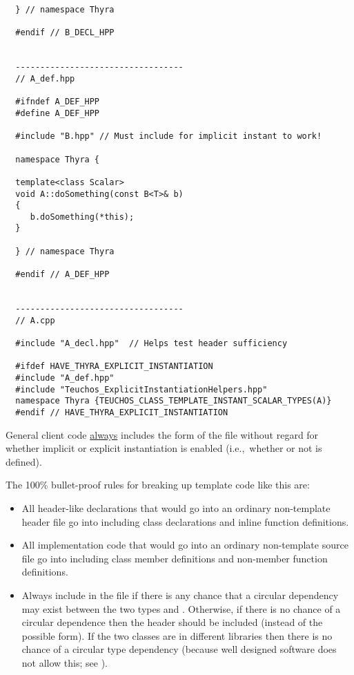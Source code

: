 \begin{itemize}
{\begin{verbatim}
  } // namespace Thyra

  #endif // B_DECL_HPP


  ----------------------------------
  // A_def.hpp

  #ifndef A_DEF_HPP
  #define A_DEF_HPP

  #include "B.hpp" // Must include for implicit instant to work!

  namespace Thyra {

  template<class Scalar>
  void A::doSomething(const B<T>& b)
  {
     b.doSomething(*this);
  }

  } // namespace Thyra

  #endif // A_DEF_HPP


  ----------------------------------
  // A.cpp

  #include "A_decl.hpp"  // Helps test header sufficiency

  #ifdef HAVE_THYRA_EXPLICIT_INSTANTIATION
  #include "A_def.hpp"
  #include "Teuchos_ExplicitInstantiationHelpers.hpp"
  namespace Thyra {TEUCHOS_CLASS_TEMPLATE_INSTANT_SCALAR_TYPES(A)}
  #endif // HAVE_THYRA_EXPLICIT_INSTANTIATION
\end{verbatim}}


General client code \underline{always} includes the  form
of the file without regard for whether implicit or explicit
instantiation is enabled (i.e.,\ whether or not
 is defined).

The 100\% bullet-proof rules for breaking up template code like this are:

\begin{itemize}

\item All header-like declarations that would go into an ordinary
  non-template  header file go into
   including class declarations and inline
  function definitions.

\item All implementation code that would go into an ordinary
  non-template  source file go into
   including class member definitions and
  non-member function definitions.

\item Always include  in the
   file if there is any chance that a
  circular dependency may exist between the two types
   and .  Otherwise, if there is
  no chance of a circular dependence then the header
   should be included (instead of the
  possible  form).  If the two classes are in
  different libraries then there is no chance of a circular type
  dependency (because well designed software does not allow this; see
  \cite{AgileSoftwareDevelopment}).


\end{itemize}
\end{itemize}
